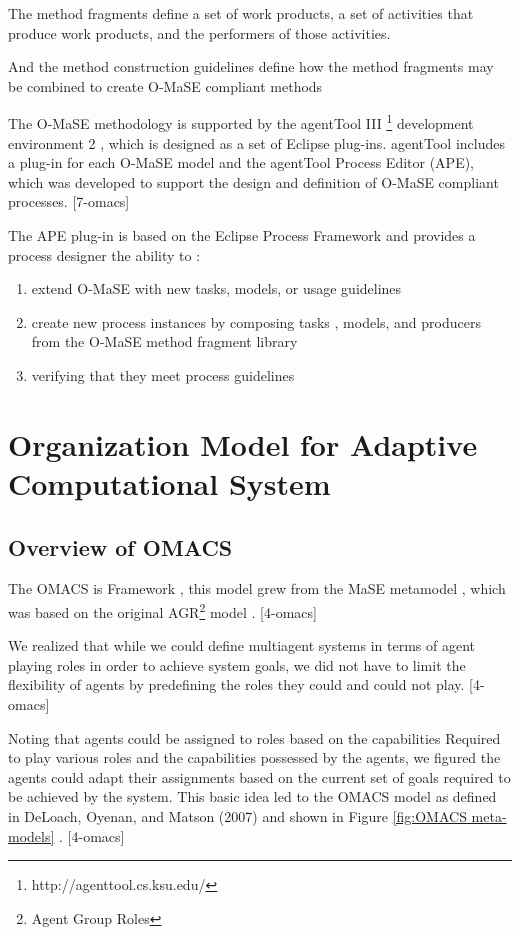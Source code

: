 The method fragments define a set of work products, a set of activities that produce work products, and the performers of those activities.

And the method construction guidelines define how the method fragments may be
combined to create O-MaSE compliant methods

The O-MaSE methodology is supported by the agentTool III \footnote{http://agenttool.cs.ksu.edu/}
 development environment 2 , 
which is designed as a set of Eclipse plug-ins. agentTool includes a plug-in for each O-MaSE model 
and the agentTool Process Editor (APE), which was developed to support the design and definition 
of O-MaSE compliant processes. [7-omacs]

The APE plug-in is based on the Eclipse Process Framework and provides a process designer the ability to : 
\begin{enumerate}
\item 
	extend O-MaSE with new tasks, models, or usage guidelines
\item
	create new process instances by composing tasks
, models, and producers from the O-MaSE method fragment library  
\item
	 verifying that they meet process guidelines
\end{enumerate} 
 
\section{  Organization Model for Adaptive Computational System }
\subsection{ Overview of OMACS }
The OMACS is Framework , this model grew from the MaSE metamodel , 
which was based on the original AGR\footnote{Agent Group Roles}  model . [4-omacs]

We realized that while we could define multiagent systems in terms of agent
playing roles in order to achieve system goals, we did not have to limit the flexibility
of agents by predefining the roles they could and could not play. [4-omacs]

Noting that agents could be assigned to roles based on the capabilities 
Required to play various roles and the capabilities possessed by the agents,
we figured the agents could adapt their assignments based on the current 
set of goals required to be achieved by the system.
This basic idea led to the OMACS  model as defined in DeLoach,
Oyenan, and Matson (2007) and shown in Figure \ref{fig:OMACS meta-models} . [4-omacs]

